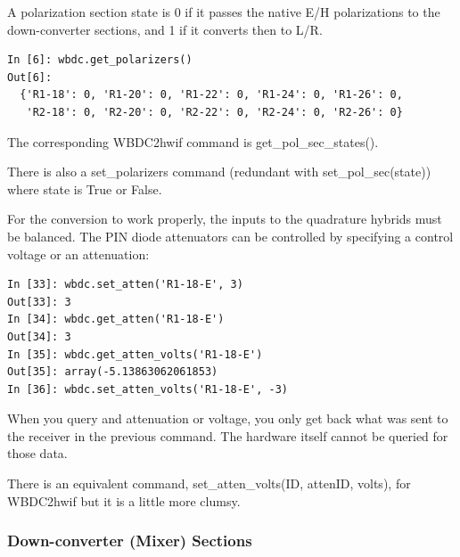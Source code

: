 \documentclass[letterpaper,11pt]{book}
\begin{document}
A polarization section state is 0 if it passes the native E/H polarizations to
the down-converter sections, and 1 if it converts then to L/R.
\begin{verbatim}
In [6]: wbdc.get_polarizers()
Out[6]:
  {'R1-18': 0, 'R1-20': 0, 'R1-22': 0, 'R1-24': 0, 'R1-26': 0,
   'R2-18': 0, 'R2-20': 0, 'R2-22': 0, 'R2-24': 0, 'R2-26': 0}
\end{verbatim}
The corresponding {\ttfamily WBDC2hwif} command is 
{\ttfamily get\_pol\_sec\_states()}.

There is also a {\ttfamily set\_polarizers} command (redundant with
{\ttfamily set\_pol\_sec(state)}) where
{\ttfamily state} is True or False. 

For the conversion to work properly, the inputs to the quadrature hybrids
must be balanced.  The PIN diode attenuators can be controlled by specifying
a control voltage or an attenuation:
\begin{verbatim}
In [33]: wbdc.set_atten('R1-18-E', 3)
Out[33]: 3
In [34]: wbdc.get_atten('R1-18-E')
Out[34]: 3
In [35]: wbdc.get_atten_volts('R1-18-E')
Out[35]: array(-5.13863062061853)
In [36]: wbdc.set_atten_volts('R1-18-E', -3)\end{verbatim}
When you query and attenuation or voltage, you only get back what was sent to
the receiver in the previous command.  The hardware itself cannot be queried for
those data.

There is an equivalent command, {\ttfamily set\_atten\_volts(ID, attenID, volts)},
for {\ttfamily WBDC2hwif} but it is a little more clumsy.

\subsubsection{Down-converter (Mixer) Sections}
\end{document}
